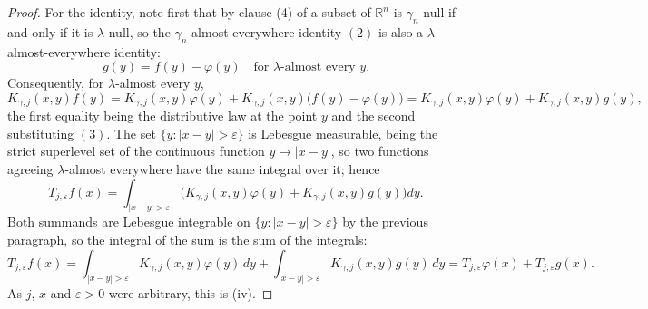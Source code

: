 \begin{proof}
For the identity, note first that by clause (4) of
 a subset of $\mathbb{R}^n$ is
$\gamma_n$-null if and only if it is $\lambda$-null, so the
$\gamma_n$-almost-everywhere identity $(2)$ is also a
$\lambda$-almost-everywhere identity:
\begin{equation*}
  g(y) = f(y) - \varphi(y) \quad \text{for } \lambda\text{-almost every } y .
  \tag{3}
\end{equation*}
Consequently, for $\lambda$-almost every $y$,
\[
  K_{\gamma,j}(x,y)f(y)
    = K_{\gamma,j}(x,y)\varphi(y) + K_{\gamma,j}(x,y)\bigl(f(y)-\varphi(y)\bigr)
    = K_{\gamma,j}(x,y)\varphi(y) + K_{\gamma,j}(x,y)g(y) ,
\]
the first equality being the distributive law at the point $y$ and the second
substituting $(3)$.  The set $\{y : |x-y| > \varepsilon\}$ is Lebesgue
measurable, being the strict superlevel set of the continuous function
$y \mapsto |x-y|$, so two functions agreeing $\lambda$-almost everywhere have
the same integral over it; hence
\[
  T_{j,\varepsilon}f(x)
    = \int_{|x-y|>\varepsilon}
        \bigl(K_{\gamma,j}(x,y)\varphi(y) + K_{\gamma,j}(x,y)g(y)\bigr)dy .
\]
Both summands are Lebesgue integrable on $\{y : |x-y| > \varepsilon\}$ by the
previous paragraph, so the integral of the sum is the sum of the integrals:
\[
  T_{j,\varepsilon}f(x)
    = \int_{|x-y|>\varepsilon}K_{\gamma,j}(x,y)\varphi(y)\,dy
      + \int_{|x-y|>\varepsilon}K_{\gamma,j}(x,y)g(y)\,dy
    = T_{j,\varepsilon}\varphi(x) + T_{j,\varepsilon}g(x) .
\]
As $j$, $x$ and $\varepsilon > 0$ were arbitrary, this is (iv).
\end{proof}
